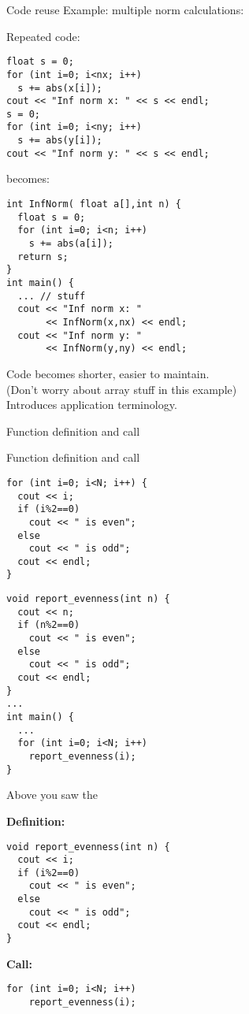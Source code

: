 \begin{block}{Code reuse}
  \label{sl:function-reuse}
Example: multiple norm calculations:
  \begin{multicols}{2}
    \small
    Repeated code:
\begin{verbatim}
float s = 0;
for (int i=0; i<nx; i++)
  s += abs(x[i]);
cout << "Inf norm x: " << s << endl;
s = 0;
for (int i=0; i<ny; i++)
  s += abs(y[i]);
cout << "Inf norm y: " << s << endl;
\end{verbatim}
\vfill\columnbreak
becomes:
\begin{verbatim}
int InfNorm( float a[],int n) {
  float s = 0;
  for (int i=0; i<n; i++)
    s += abs(a[i]);
  return s;
}
int main() {
  ... // stuff
  cout << "Inf norm x: "
       << InfNorm(x,nx) << endl;
  cout << "Inf norm y: " 
       << InfNorm(y,ny) << endl;
\end{verbatim}
  \end{multicols}
  Code becomes shorter, easier to maintain.\\
  (Don't worry about array stuff in this example)\\
  Introduces application terminology.
\end{block}

 {Function definition and call}

\begin{slide}{Function definition and call}
  \label{sl:def-call}
  \begin{multicols}{2}
\begin{verbatim}
for (int i=0; i<N; i++) {
  cout << i;
  if (i%2==0)
    cout << " is even";
  else
    cout << " is odd";
  cout << endl;
}
\end{verbatim}
\columnbreak
\begin{verbatim}
void report_evenness(int n) {
  cout << n;
  if (n%2==0)
    cout << " is even";
  else
    cout << " is odd";
  cout << endl;
}
...
int main() {
  ...
  for (int i=0; i<N; i++)
    report_evenness(i);
}
\end{verbatim}
  \end{multicols}
\end{slide}

Above you saw the 

\begin{multicols}{2}
  \textbf{Definition:}
\begin{verbatim}
void report_evenness(int n) {
  cout << i;
  if (i%2==0)
    cout << " is even";
  else
    cout << " is odd";
  cout << endl;
}
\end{verbatim}
\columnbreak
\textbf{Call:}
\begin{verbatim}
for (int i=0; i<N; i++)
    report_evenness(i);
\end{verbatim}
\end{multicols}

